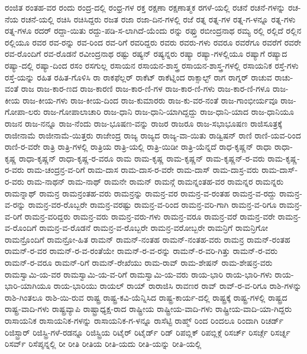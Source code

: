 {ರಂಜಿತ
ರಂತಹ-ವರ
ರಂದು
ರಂದ್ರ-ದಲ್ಲಿ
ರಂಧ್ರ-ಗಳ
ರಕ್ತ
ರಕ್ಷಣಾ
ರಕ್ಷಣಾತ್ಮಕ
ರಗಳೆ-ಯಲ್ಲಿ
ರಚನೆ
ರಚನೆ-ಗಳನ್ನು
ರಚ-ನೆಯ
ರಚನೆ-ಯಲ್ಲಿ
ರಚಿಸಿ
ರಚಿಸಿದ್ದರು
ರಜತ
ರಜಾ
ರಜಾ-ದಿನ-ಗಳಲ್ಲಿ
ರಜೆ
ರತ್ನ
ರತ್ನ-ಗಳ
ರತ್ನ-ಗ-ಳನ್ನೂ
ರತ್ನ-ಗಳು
ರತ್ನ-ಗಳೂ
ರದರ್
ರದ್ದಾ-ಯಿತು
ರದ್ದು-ಪಡಿ-ಸ-ಲಾಗಿದೆ-ಯೆಂದು
ರನ್ನು
ರಫ್ತು
ರಬೀಂದ್ರನಾಥ
ರಮ್ಯ
ರಲ್ಲಿ
ರಲ್ಲಿದೆ
ರಲ್ಲಿನ
ರಲ್ಲಿಯೂ
ರವರ
ರವ-ರನ್ನು
ರವ-ರಿಂದ
ರವ-ರಿಗೆ
ರವರಿದ್ದರು
ರವರು
ರವರು-ಗಳು
ರವರೂ
ರವರೆಗೂ
ರವರೆಗೆ
ರವರೇ
ರವ-ರೊಂದಿಗೆ
ರವ-ರೊಡನೆ
ರವೀಂದ್ರನಾಥ
ರಷ್ಟು
ರಷ್ಯನ್
ರಷ್ಯನ್ನರು
ರಷ್ಯಾ
ರಷ್ಯಾ-ಗಳಲ್ಲಿಯೂ
ರಷ್ಯಾಗೆ
ರಷ್ಯಾದ
ರಷ್ಯಾ-ದಲ್ಲಿ
ರಷ್ಯಾ-ದಿಂದ
ರಸಂ
ರಸಗುಲ್ಲ
ರಸಾಯನ
ರಸಾಯನ-ಶಾಸ್ತ್ರ
ರಸಾಯನ-ಶಾಸ್ತ್ರ-ಗಳಲ್ಲಿ
ರಸಾಯನಿಕ
ರಸ್ತೆ-ಗಳು
ರಸ್ತೆ-ಯನ್ನು
ರಹಿತ
ರಹಿತ-ಗೊಳಿಸಿ
ರಾ
ರಾಕಫೆಲ್ಲರ್
ರಾಕೆಟ್
ರಾಕೆಟ್ನಿಂದ
ರಾಕ್ಸಾಲ್ಟ್
ರಾಗ
ರಾಗ್ನರ್
ರಾಚುವ
ರಾಚು-ವಂತೆ
ರಾಜ
ರಾಜ-ಕಾರ-ಣದ
ರಾಜ-ಕಾರಣಿ
ರಾಜ-ಕಾರ-ಣಿ-ಗಳ
ರಾಜ-ಕಾರ-ಣಿ-ಗಳು
ರಾಜ-ಕಾರ-ಣಿ-ಗಳೂ
ರಾಜ-ಕೀಯ
ರಾಜ-ಕೀಯ-ಗಳು
ರಾಜ-ಕೀಯ-ದಿಂದ
ರಾಜ-ಕುಮಾರರು
ರಾಜ-ಕು-ವರ-ನಂತೆ
ರಾಜ-ಗಾಂಭೀರ್ಯವೂ
ರಾಜ-ಗೋಪಾ-ಲರು
ರಾಜ-ಗೋಪಾಲಾಚಾರಿ
ರಾಜ-ಧಾನಿ
ರಾಜ-ಧಾನಿ-ಯಾಗಿದ್ದದ್ದು
ರಾಜ-ಧಾನಿ-ಯಾದ
ರಾಜ-ಧಾನಿಯೂ
ರಾಜನ
ರಾಜ-ನನ್ನೂ
ರಾಜ-ನೆಂದು
ರಾಜ-ಭೂಷಣ-ವನ್ನು
ರಾಜರ
ರಾಜರೂ
ರಾಜ-ಸಭಾಭೂಷಣ
ರಾಜಿಸೂತ್ರಕ್ಕೆ
ರಾಜೀನಾಮೆ
ರಾಜೀನಾಮೆ-ಯಿತ್ತರು
ರಾಜೇಂದ್ರ
ರಾಜ್ಯ
ರಾಜ್ಯದ
ರಾಜ್ಯ-ವಾ-ಯಿತು
ರಾಡ್ವಿಷನ್
ರಾಣಿ
ರಾಣಿ-ಯವ-ರಿಂದ
ರಾಣಿ-ರ-ವರೇ
ರಾತ್ರಿ
ರಾತ್ರಿ-ಗಳಲ್ಲಿ
ರಾತ್ರಿಯ
ರಾತ್ರಿ-ಯಲ್ಲಿ
ರಾತ್ರಿ-ಯಿಡೀ
ರಾತ್ರಿ-ಯೆನ್ನದೆ
ರಾಧ-ಕೃಷ್ಣನ್
ರಾಧಾ
ರಾಧಾ-ಕೃಷ್ಣ
ರಾಧಾ-ಕೃಷ್ಣನ್
ರಾಧಾ-ಕೃಷ್ಣ-ರ-ವರೂ
ರಾಮ
ರಾಮ-ಕೃಷ್ಣ
ರಾಮ-ಕೃಷ್ಣನ್
ರಾಮ-ಕೃಷ್ಣನ್-ರ-ವರು
ರಾಮ-ಕೃಷ್ಣ-ರ-ವರು
ರಾಮ-ಚಂದ್ರನ್ರ-ವ-ರಿಗೆ
ರಾಮ-ದಾಸ
ರಾಮ-ದಾಸ-ರ-ವರೇ
ರಾಮ-ದಾಸ್
ರಾಮ-ದಾಸ್ರ-ವರು
ರಾಮ-ದಾಸ್-ರ-ವರು
ರಾಮ-ನಾಥನ್
ರಾಮ-ನಾಥ್
ರಾಮನೇ
ರಾಮನ್
ರಾಮನ್ಗೆ
ರಾಮನ್ನಂತಹ-ವರ
ರಾಮನ್ನರ
ರಾಮನ್ನರು
ರಾಮನ್ನಾಥ್
ರಾಮನ್ರ
ರಾಮನ್ರಂತಹ-ವರು
ರಾಮನ್ರನ್ನು
ರಾಮನ್ರ-ವರ
ರಾಮನ್ರ-ವ-ರಂತಹ
ರಾಮನ್ರ-ವ-ರದ್ದು
ರಾಮನ್ರ-ವ-ರನ್ನು
ರಾಮನ್ರ-ವರ-ರೊಬ್ಬರೇ
ರಾಮನ್ರ-ವರಷ್ಟು
ರಾಮನ್ರ-ವ-ರಿಂದ
ರಾಮನ್ರ-ವರಿ-ಗಾಗಿ
ರಾಮನ್ರ-ವ-ರಿಗೂ
ರಾಮನ್ರ-ವ-ರಿಗೆ
ರಾಮನ್ರ-ವರಿದ್ದರು
ರಾಮನ್ರ-ವರು
ರಾಮನ್ರ-ವರು-ಗಳು
ರಾಮನ್ರ-ವರೂ
ರಾಮನ್ರ-ವರೆ
ರಾಮನ್ರ-ವರೇ
ರಾಮನ್ರ-ವ-ರೊಂದಿಗೆ
ರಾಮನ್ರ-ವ-ರೊಡನೆ
ರಾಮನ್ರ-ವ-ರೊಬ್ಬರೇ
ರಾಮನ್ರ-ವರೋಬ್ಬರೇ
ರಾಮನ್ರಿಗೆ
ರಾಮನ್ರಿಗೋ
ರಾಮನ್ರೊಂದಿಗೆ
ರಾಮನ್ರೋ-ಹಿತ
ರಾಮನ್
ರಾಮನ್-ನಂತಹ
ರಾಮನ್-ನಂತಹ-ವರು
ರಾಮನ್ರ
ರಾಮನ್-ರಂತಹ
ರಾಮನ್-ರ-ವರ
ರಾಮನ್-ರ-ವ-ರಂತೆಯೇ
ರಾಮನ್-ರ-ವ-ರನ್ನು
ರಾಮನ್-ರ-ವರಿ-ಗಿತ್ತು
ರಾಮನ್-ರ-ವರು
ರಾಮನ್-ರ-ವರೂ
ರಾಮನ್-ರಿಗೆ
ರಾಮನ್-ರೇಖೆಯು
ರಾಮ-ರಾವ್
ರಾಮ-ಶೇಷನ್
ರಾಮ-ಶೇಷನ್ರ-ವರು
ರಾಮಸ್ವಾಮಿ-ಯ-ವರ
ರಾಮಸ್ವಾಮಿ-ಯ-ವ-ರಿಗೆ
ರಾಮಸ್ವಾಮಿ-ಯ-ವರು
ರಾಯ-ಭಾರಿ
ರಾಯ-ಭಾರಿ-ಗಳು
ರಾಯ-ಭಾರಿ-ಯಾಗಿಯೂ
ರಾಯ-ಭಾರಿಯು
ರಾಯಲ್
ರಾಯ್
ರಾರಾಜಿಸಿ
ರಾವಣರ
ರಾವ್
ರಾವ್-ರ-ವ-ರಿಗೂ
ರಾಶಿ-ಗಳನ್ನು
ರಾಶಿ-ಗಿಂತಲೂ
ರಾಶಿ-ಯಿ-ರುವ
ರಾಷ್ಟ್ರ
ರಾಷ್ಟ್ರ-ಕವಿ-ಯೆನ್ನಿಸಿದ
ರಾಷ್ಟ್ರ-ಕಾರ್ಯ-ದಲ್ಲಿ
ರಾಷ್ಟ್ರಕ್ಕೆ
ರಾಷ್ಟ್ರ-ಗಳಲ್ಲಿ
ರಾಷ್ಟ್ರದ
ರಾಷ್ಟ್ರ-ವಾದಿ-ಗಳು
ರಾಷ್ಟ್ರವ್ಯಾಪಿ
ರಾಷ್ಟ್ರಾಧ್ಯಕ್ಷ-ರಾದ
ರಾಷ್ಟ್ರೀಯ
ರಾಷ್ಟ್ರೀಯ-ವಾದಿ-ಗಳು
ರಾಷ್ಟ್ರೀಯ-ವಾದಿ-ಯಾ-ಗಿದ್ದರು
ರಾಸಾಯನಿಕ
ರಾಸಾಯನಿಕ-ಗಳನ್ನು
ರಾಸಾಯನಿಕ-ಗ-ಳನ್ನೂ
ರಾಸೆಟ್ಟಿ
ರಾಹ್ಮ್
ರಿಂದ
ರಿಂದಲೂ
ರಿಂದಾಗಿ
ರಿಚರ್ಡ್
ರಿಜಿಸ್ಟ್ರಾರ್
ರಿಜಿಸ್ಟ್ರಿ-ಗಳೆ-ರಡನ್ನೂ
ರಿಜಿಸ್ಟ್ರಿಯ
ರಿಟೈರ್
ರಿಟೈರ್ಡ್
ರಿಡ್
ರಿಪಬ್ಲಿಕ್
ರಿಪಬ್ಲಿಕ್ಗೆ
ರಿಸರ್ಚ್
ರಿಸರ್ಚ್ಗೆ
ರಿಸರ್ಚ್ನ
ರಿಸರ್ವ್
ರಿಸೆಪ್ಶನ್ನಲ್ಲಿ
ರೀ
ರೀತಿ
ರೀತಿಯ
ರೀತಿ-ಯದು
ರೀತಿ-ಯನ್ನು
ರೀತಿ-ಯಲ್ಲಿ
}
